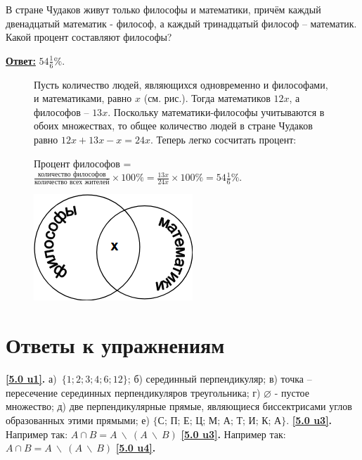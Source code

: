 \begin{thm}
В стране Чудаков живут только философы и математики, причём каждый двенадцатый математик - философ, а каждый тринадцатый философ – математик. Какой процент составляют философы?
\end{thm}
\par
\textbf{\underline{Ответ:}} $54\frac{1}{6}\%$.

\begin{figure}[H]
\begin{minipage}{0.7\linewidth}\setlength{\parindent}{1.5em}
    \begin{prf} 
    Пусть количество людей, являющихся одновременно и философами, и математиками, равно $x$ (см. рис.). Тогда математиков $12x$, а философов – $13x$. Поскольку математики-философы учитываются в обоих множествах, то общее количество людей в стране Чудаков равно $12x + 13x - x = 24x$. Теперь легко сосчитать процент:
    \par
    Процент философов = $\frac{\textit{количество философов}}{\textit{количество всех жителей}} \times 100\% = \frac{13x}{24x} \times 100\% = 54\frac{1}{6}\%$.
    \end{prf}
\end{minipage}
\hfill
\begin{minipage}{0.25\linewidth}%
    \includegraphics[width=0.9\columnwidth]{img/filosof.png}
\end{minipage}
\end{figure}

\section{Ответы к упражнениям}

\textbf{\ref{5.0 u1}.} а)~$\{1; 2; 3; 4; 6; 12\}$; б) серединный перпендикуляр; в) точка – пересечение серединных перпендикуляров треугольника; г) $\varnothing$ - пустое множество; д) две перпендикулярные прямые, являющиеся биссектрисами углов образованных этими прямыми; е) $\{\textit{С; П; Е; Ц; М; А; Т; И; К; А}\}$. 
\textbf{\ref{5.0 u3}.} Например так: $A \cap B = A~\backslash~(A~\backslash~B)$
\textbf{\ref{5.0 u3}.} Например так: $A \cap B = A~\backslash~(A~\backslash~B)$
\textbf{\ref{5.0 u4}.} 

